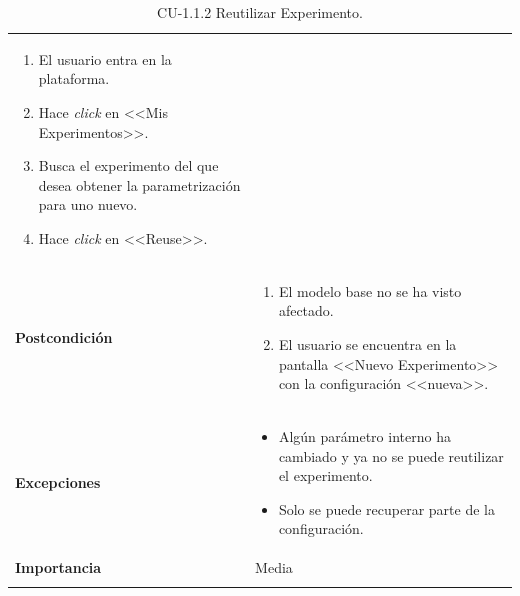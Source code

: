 \begin{longtable}[H]{@{}ll@{}}
\begin{minipage}[t]{0.71\columnwidth}
\begin{enumerate}
\def\labelenumi{\arabic{enumi}.}
\tightlist
\item El usuario entra en la plataforma.
\item Hace \textit{click} en <<Mis Experimentos>>.
\item Busca el experimento del que desea obtener la parametrización para uno nuevo.
\item Hace \textit{click} en <<Reuse>>.
\end{enumerate}\strut
\end{minipage}\tabularnewline
\begin{minipage}[t]{0.23\columnwidth}\raggedright\strut
\textbf{Postcondición}\strut
\end{minipage} & \begin{minipage}[t]{0.71\columnwidth}\raggedright\strut
\begin{enumerate}
\tightlist
\item El modelo base no se ha visto afectado.
\item El usuario se encuentra en la pantalla <<Nuevo Experimento>> con la configuración <<nueva>>.
\end{enumerate}\strut
\end{minipage}\tabularnewline
\begin{minipage}[t]{0.23\columnwidth}\raggedright\strut
\textbf{Excepciones}\strut
\end{minipage} & \begin{minipage}[t]{0.71\columnwidth}\raggedright\strut
\begin{itemize}
\tightlist
\item Algún parámetro interno ha cambiado y ya no se puede reutilizar el experimento.
\item Solo se puede recuperar parte de la configuración.
\end{itemize}\strut
\end{minipage}\tabularnewline
\begin{minipage}[t]{0.23\columnwidth}\raggedright\strut
\textbf{Importancia}\strut
\end{minipage} & \begin{minipage}[t]{0.71\columnwidth}\raggedright\strut
Media\strut
\end{minipage}\tabularnewline
\bottomrule
\caption{CU-1.1.2 Reutilizar Experimento.}
\end{longtable}

